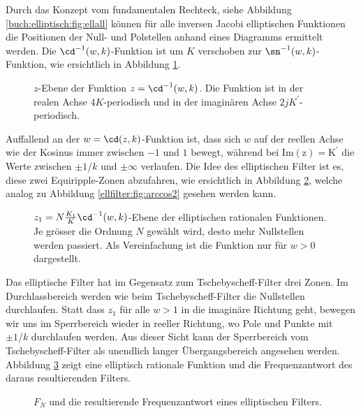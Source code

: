 Durch das Konzept vom fundamentalen Rechteck, siehe Abbildung \ref{buch:elliptisch:fig:ellall} können für alle inversen Jacobi elliptischen Funktionen die Positionen der Null- und Polstellen anhand eines Diagramms ermittelt werden.
Die $\cd^{-1}(w, k)$-Funktion ist um $K$ verschoben zur $\sn^{-1}(w, k)$-Funktion, wie ersichtlich in Abbildung \ref{ellfilter:fig:cd}.
\begin{figure}
    \centering
    
    \caption{
        $z$-Ebene der Funktion $z = \cd^{-1}(w, k)$.
        Die Funktion ist in der realen Achse $4K$-periodisch und in der imaginären Achse $2jK^\prime$-periodisch.
    }
    \label{ellfilter:fig:cd}
\end{figure}
Auffallend an der $w = \cd(z, k)$-Funktion ist, dass sich $w$ auf der reellen Achse wie der Kosinus immer zwischen $-1$ und $1$ bewegt, während bei $\mathrm{Im(z) = K^\prime}$ die Werte zwischen $\pm 1/k$ und $\pm \infty$ verlaufen.
Die Idee des elliptischen Filter ist es, diese zwei Equiripple-Zonen abzufahren, wie ersichtlich in Abbildung \ref{ellfilter:fig:cd2}, welche analog zu Abbildung \ref{ellfilter:fig:arccos2} gesehen werden kann.
\begin{figure}
    \centering
    
    \caption{
        $z_1=N\frac{K_1}{K}\cd^{-1}(w, k)$-Ebene der elliptischen rationalen Funktionen.
        Je grösser die Ordnung $N$ gewählt wird, desto mehr Nullstellen werden passiert.
        Als Vereinfachung ist die Funktion nur für $w>0$ dargestellt.
    }
    \label{ellfilter:fig:cd2}
\end{figure}
Das elliptische Filter hat im Gegensatz zum Tschebyscheff-Filter drei Zonen.
Im Durchlassbereich werden wie beim Tschebyscheff-Filter die Nullstellen durchlaufen.
Statt dass $z_1$ für alle $w>1$ in die imaginäre Richtung geht, bewegen wir uns im Sperrbereich wieder in reeller Richtung, wo Pole und Punkte mit $\pm 1/k$ durchlaufen werden.
Aus dieser Sicht kann der Sperrbereich vom Tschebyscheff-Filter als unendlich langer Übergangsbereich angesehen werden.
Abbildung \ref{ellfilter:fig:elliptic_freq} zeigt eine elliptisch rationale Funktion und die Frequenzantwort des daraus resultierenden Filters.
\begin{figure}
    \centering
    
    \caption{$F_N$ und die resultierende Frequenzantwort eines elliptischen Filters.}
    \label{ellfilter:fig:elliptic_freq}
\end{figure}

